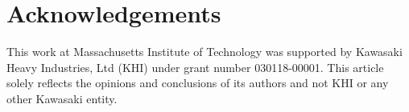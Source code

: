 \documentclass[letterpaper]{article} %
\theoremstyle{definition}
\begin{document}
\section*{Acknowledgements}
This work at Massachusetts Institute of Technology was supported by Kawasaki Heavy Industries, Ltd (KHI) under grant number 030118-00001. This article solely reflects the opinions and conclusions of its authors and not KHI or any other Kawasaki entity.

\end{document}
